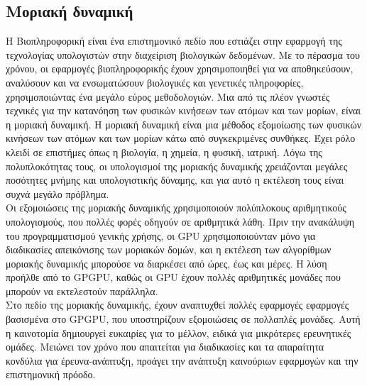 \subsection{Μοριακή δυναμική}
Η Βιοπληροφορική είναι ένα επιστημονικό πεδίο που εστιάζει στην εφαρμογή της τεχνολογίας υπολογιστών στην διαχείριση βιολογικών δεδομένων. Με το πέρασμα του χρόνου, οι εφαρμογές βιοπληροφορικής έχουν χρησιμοποιηθεί για να αποθηκεύσουν, αναλύσουν και να ενσωματώσουν βιολογικές και γενετικές πληροφορίες, χρησιμοποιώντας ένα μεγάλο εύρος μεθοδολογιών. Μια από τις πλέον γνωστές τεχνικές για την κατανόηση των φυσικών κινήσεων των ατόμων και των μορίων, είναι η μοριακή δυναμική. Η μοριακή δυναμική είναι μια μέθοδος εξομοίωσης των φυσικών κινήσεων των ατόμων και των μορίων κάτω από συγκεκριμένες συνθήκες. Έχει ρόλο κλειδί σε επιστήμες όπως η βιολογία, η χημεία, η φυσική, ιατρική. Λόγω της πολυπλοκότητας τους, οι υπολογισμοί της μοριακής δυναμικής χρειάζονται μεγάλες ποσότητες μνήμης και υπολογιστικής δύναμης, και για αυτό η εκτέλεση τους είναι συχνά μεγάλο πρόβλημα.\\
Οι εξομοιώσεις της μοριακής δυναμικής χρησιμοποιούν πολύπλοκους αριθμητικούς υπολογισμούς, που πολλές φορές οδηγούν σε αριθμητικά λάθη. Πριν την ανακάλυψη του προγραμματισμού γενικής χρήσης, οι GPU χρησιμοποιούνταν μόνο για διαδικασίες απεικόνισης των μοριακών δομών, και η εκτέλεση των αλγορίθμων μοριακής δυναμικής μπορούσε να διαρκέσει από ώρες, έως και μέρες. Η λύση προήλθε από το GPGPU, καθώς οι GPU έχουν πολλές αριθμητικές μονάδες που μπορούν να εκτελεστούν παράλληλα. \\
Στο πεδίο της μοριακής δυναμικής, έχουν αναπτυχθεί πολλές εφαρμογές εφαρμογές βασισμένα στο GPGPU, που υποστηρίζουν εξομοιώσεις σε πολλαπλές μονάδες. Αυτή η καινοτομία δημιουργεί ευκαιρίες για το μέλλον, ειδικά για μικρότερες ερευνητικές ομάδες. Μειώνει τον χρόνο που απαιτείται για διαδικασίες και τα απαραίτητα κονδύλια για έρευνα-ανάπτυξη, προάγει την ανάπτυξη καινούριων εφαρμογών και την επιστημονική πρόοδο.
